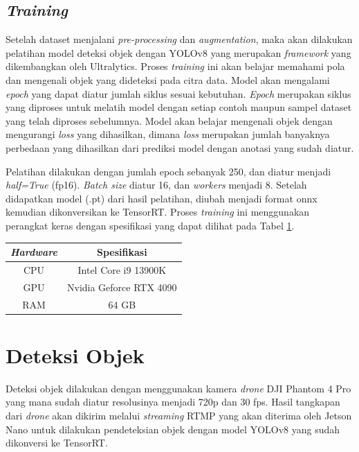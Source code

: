 \subsection{\emph{Training}}
Setelah dataset menjalani \emph{pre-processing} dan \emph{augmentation}, maka akan dilakukan pelatihan model deteksi objek dengan YOLOv8 yang merupakan \emph{framework} yang dikembangkan oleh Ultralytics. Proses \emph{training} ini akan belajar memahami pola dan mengenali objek yang dideteksi pada citra data. Model akan mengalami \emph{epoch} yang dapat diatur jumlah siklus sesuai kebutuhan. \emph{Epoch} merupakan siklus yang diproses untuk melatih model dengan setiap contoh maupun sampel dataset yang telah diproses sebelumnya. Model akan belajar mengenali objek dengan mengurangi \emph{loss} yang dihasilkan, dimana \emph{loss} merupakan jumlah banyaknya perbedaan yang dihasilkan dari prediksi model dengan anotasi yang sudah diatur. 

Pelatihan dilakukan dengan jumlah epoch sebanyak 250, dan diatur menjadi \emph{half=True} (fp16). \emph{Batch size} diatur 16, dan \emph{workers} menjadi 8. Setelah didapatkan model (.pt) dari hasil pelatihan, diubah menjadi format onnx kemudian dikonversikan ke TensorRT. Proses \emph{training} ini menggunakan perangkat keras dengan spesifikasi yang dapat dilihat pada Tabel \ref{tbl:specpc}.

  \begin{table}[h!]
    \centering
    \label{tbl:specpc}
    \begin{tabular}{|c|c|}
      \hline
      \rowcolor[gray]{0.9}
      \textbf{\emph{Hardware}} & \textbf{Spesifikasi} \\ \hline
      CPU               & Intel Core i9 13900K \\ \hline
      GPU               & Nvidia Geforce RTX 4090 \\ \hline
      RAM               & 64 GB \\ \hline
    \end{tabular}
  \end{table}
 
\section{Deteksi Objek}
Deteksi objek dilakukan dengan menggunakan kamera \emph{drone} DJI Phantom 4 Pro yang mana sudah diatur resolusinya menjadi 720p dan 30 fps. Hasil tangkapan dari \emph{drone} akan dikirim melalui \emph{streaming} RTMP yang akan diterima oleh Jetson Nano untuk dilakukan pendeteksian objek dengan model YOLOv8 yang sudah dikonversi ke TensorRT.

